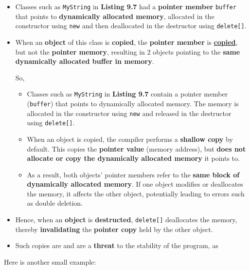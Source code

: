 \documentclass[10pt]{article}
\newcommand{\vocab}[1]{\fbox{\textbf{\textit{#1}}}}
\begin{document}
\begin{itemize}
	\item Classes such as \verb|MyString| in \textbf{Listing 9.7} had a \textbf{pointer member} \verb|buffer| that points to \textbf{dynamically allocated memory}, allocated in the constructor using \verb|new| and then deallocated in the destructor using \verb|delete[]|.

\item When an \textbf{object} of this class is \textbf{copied}, the \textbf{pointer member} is \underline{\textbf{copied}}, but not the \textbf{pointer memory}, resulting in 2 objects pointing to the \textbf{same dynamically allocated buffer in memory}.

	So,

	\begin{itemize}
    \item Classes such as \verb|MyString| in \textbf{Listing 9.7} contain a pointer member (\verb|buffer|) that points to dynamically allocated memory. The memory is allocated in the constructor using \verb|new| and released in the destructor using \verb|delete[]|.

    \item When an object is copied, the compiler performs a \textbf{shallow copy} by default. This copies the \textbf{pointer value} (memory address), but \textbf{does not allocate or copy the dynamically allocated memory} it points to.

    \item As a result, both objects' pointer members refer to the \textbf{same block of dynamically allocated memory}. If one object modifies or deallocates the memory, it affects the other object, potentially leading to errors such as double deletion.
\end{itemize}

\item Hence, when an \textbf{object} is \textbf{destructed}, \verb|delete[]| deallocates the memory, thereby \textbf{invalidating} the \textbf{pointer copy} held by the other object.

\item Such copies are \vocab{shallow} and are a \textbf{threat} to the stability of the program, as 

\end{itemize}
	\newpage
	Here is another small example:
\end{document}
